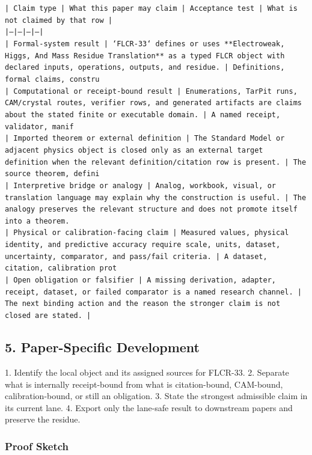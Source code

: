 \documentclass[11pt]{article}
\begin{document}
\noindent\texttt{| Claim type | What this paper may claim | Acceptance test | What is not claimed by that row |}\\
\noindent\texttt{|---|---|---|---|}\\
\noindent\texttt{| Formal-system result | `FLCR-33` defines or uses **Electroweak, Higgs, And Mass Residue Translation** as a typed FLCR object with declared inputs, operations, outputs, and residue. | Definitions, formal claims, constru}\\
\noindent\texttt{| Computational or receipt-bound result | Enumerations, TarPit runs, CAM/crystal routes, verifier rows, and generated artifacts are claims about the stated finite or executable domain. | A named receipt, validator, manif}\\
\noindent\texttt{| Imported theorem or external definition | The Standard Model or adjacent physics object is closed only as an external target definition when the relevant definition/citation row is present. | The source theorem, defini}\\
\noindent\texttt{| Interpretive bridge or analogy | Analog, workbook, visual, or translation language may explain why the construction is useful. | The analogy preserves the relevant structure and does not promote itself into a theorem. }\\
\noindent\texttt{| Physical or calibration-facing claim | Measured values, physical identity, and predictive accuracy require scale, units, dataset, uncertainty, comparator, and pass/fail criteria. | A dataset, citation, calibration prot}\\
\noindent\texttt{| Open obligation or falsifier | A missing derivation, adapter, receipt, dataset, or failed comparator is a named research channel. | The next binding action and the reason the stronger claim is not closed are stated. | }\\

\subsection*{5. Paper-Specific Development}

1. Identify the local object and its assigned sources for FLCR-33.
2. Separate what is internally receipt-bound from what is citation-bound, CAM-bound, calibration-bound, or still an obligation.
3. State the strongest admissible claim in its current lane.
4. Export only the lane-safe result to downstream papers and preserve the residue.

\subsubsection*{Proof Sketch}
\end{document}
